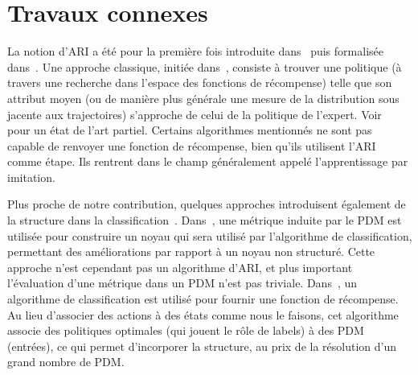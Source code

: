 \documentclass[french,utf8]{./hermes-journal}
\begin{document}

\section{Travaux connexes}
\label{seelatedWorks}

La notion d'ARI a été pour la première fois introduite dans~\cite{Russel998}
puis formalisée dans~\cite{N000}. Une approche classique, initiée dans~\cite{Abbee004}, consiste à trouver une politique (à travers une recherche dans l'espace des fonctions de récompense) telle que son attribut moyen (ou de manière plus générale une mesure de la distribution sous jacente aux trajectoires) s'approche de celui de la politique de l'expert.
%
Voir~\cite{Ne010} pour un état de l'art partiel.
%
%
Certains algorithmes mentionnés ne sont pas capable de renvoyer une fonction de récompense, bien qu'ils utilisent l'ARI comme étape. Ils rentrent dans le champ généralement appelé l'apprentissage par imitation.
%

Plus proche de notre contribution, quelques approches introduisent également de la structure dans la classification~\cite{Mel010,Ratlif006}. Dans~\cite{Mel010},
une métrique induite par le PDM est utilisée pour construire un noyau qui sera utilisé par l'algorithme de classification, permettant des améliorations par rapport à un noyau non structuré. Cette approche n'est cependant pas un algorithme d'ARI, et plus important l'évaluation d'une métrique dans un PDM n'est pas triviale. Dans~\cite{Ratlif006}, un algorithme de classification est utilisé pour fournir une fonction de récompense. Au lieu d'associer des actions à des états comme nous le faisons, cet algorithme associe des politiques optimales (qui jouent le rôle de labels) à des PDM (entrées), ce qui permet d'incorporer la structure, au prix de la résolution d'un grand nombre de PDM.
\end{document}
